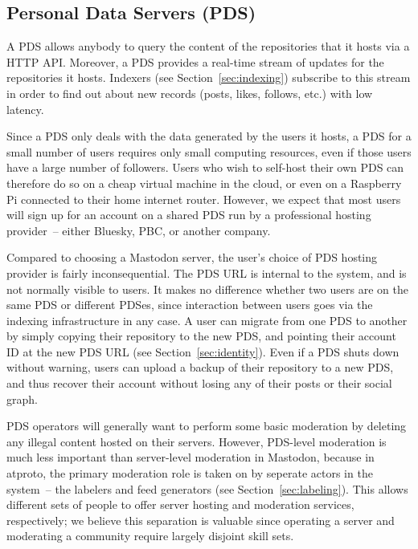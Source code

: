 \documentclass[sigconf,review]{acmart}
\begin{document}
\subsection{Personal Data Servers (PDS)}\label{sec:pds}

A PDS allows anybody to query the content of the repositories that it hosts via a HTTP API.
Moreover, a PDS provides a real-time stream of updates for the repositories it hosts.
Indexers (see Section~\ref{sec:indexing}) subscribe to this stream in order to find out about new records (posts, likes, follows, etc.) with low latency.

Since a PDS only deals with the data generated by the users it hosts, a PDS for a small number of users requires only small computing resources, even if those users have a large number of followers.
Users who wish to self-host their own PDS can therefore do so on a cheap virtual machine in the cloud, or even on a Raspberry Pi connected to their home internet router.
However, we expect that most users will sign up for an account on a shared PDS run by a professional hosting provider~-- either Bluesky, PBC, or another company.

Compared to choosing a Mastodon server, the user's choice of PDS hosting provider is fairly inconsequential.
The PDS URL is internal to the system, and is not normally visible to users.
It makes no difference whether two users are on the same PDS or different PDSes, since interaction between users goes via the indexing infrastructure in any case.
A user can migrate from one PDS to another by simply copying their repository to the new PDS, and pointing their account ID at the new PDS URL (see Section~\ref{sec:identity}).
Even if a PDS shuts down without warning, users can upload a backup of their repository to a new PDS, and thus recover their account without losing any of their posts or their social graph.

PDS operators will generally want to perform some basic moderation by deleting any illegal content hosted on their servers.
However, PDS-level moderation is much less important than server-level moderation in Mastodon, because in atproto, the primary moderation role is taken on by seperate actors in the system~-- the labelers and feed generators (see Section~\ref{sec:labeling}).
This allows different sets of people to offer server hosting and moderation services, respectively; we believe this separation is valuable since operating a server and moderating a community require largely disjoint skill sets.
\end{document}

